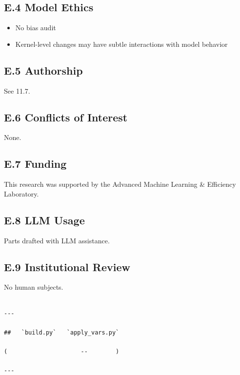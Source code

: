 \subsection{E.4 Model Ethics}

\begin{itemize}
\item No bias audit
\item Kernel-level changes may have subtle interactions with model behavior

\end{itemize}
\subsection{E.5 Authorship}

See  11.7.

\subsection{E.6 Conflicts of Interest}

None.

\subsection{E.7 Funding}

This research was supported by the Advanced Machine Learning & Efficiency Laboratory.

\subsection{E.8 LLM Usage}

Parts drafted with LLM assistance.

\subsection{E.9 Institutional Review}

No human subjects.
\begin{lstlisting}

---

##   `build.py`   `apply_vars.py`

(                     --        )

---
\end{lstlisting}